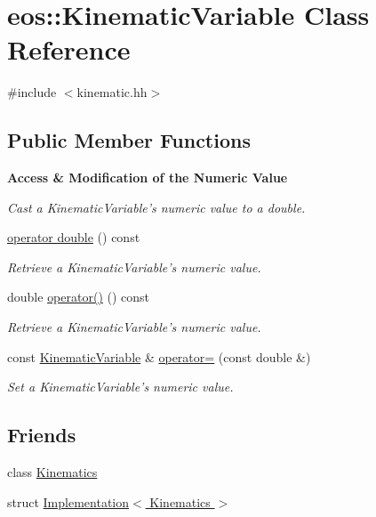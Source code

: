 \hypertarget{classeos_1_1KinematicVariable}{
\section{eos::KinematicVariable Class Reference}
\label{classeos_1_1KinematicVariable}
}


{\ttfamily \#include $<$kinematic.hh$>$}\subsection*{Public Member Functions}
\begin{Indent}{\bf Access \& Modification of the Numeric Value}\par
{\em \label{_amgrpe80791dade181f608b19efd4011ae6ee}
 Cast a KinematicVariable's numeric value to a double. }\begin{DoxyCompactItemize}
\item 
\hyperlink{classeos_1_1KinematicVariable_ae7397422b2e7c59c1bd8757705463839}{operator double} () const 
\begin{DoxyCompactList}\small\item\em Retrieve a KinematicVariable's numeric value. \item\end{DoxyCompactList}\item 
double \hyperlink{classeos_1_1KinematicVariable_a0281059d13f1e6bd8e9e36b89f96f60f}{operator()} () const 
\begin{DoxyCompactList}\small\item\em Retrieve a KinematicVariable's numeric value. \item\end{DoxyCompactList}\item 
const \hyperlink{classeos_1_1KinematicVariable}{KinematicVariable} \& \hyperlink{classeos_1_1KinematicVariable_ac6f65d2b8959b6f3b66d31be915caba9}{operator=} (const double \&)
\begin{DoxyCompactList}\small\item\em Set a KinematicVariable's numeric value. \item\end{DoxyCompactList}\end{DoxyCompactItemize}
\end{Indent}
\subsection*{Friends}
\begin{DoxyCompactItemize}
\item 
class \hyperlink{classeos_1_1KinematicVariable_a8fb81632f9425f6152aade7346401b4c}{Kinematics}
\item 
struct \hyperlink{classeos_1_1KinematicVariable_a06e93a5d7c76d2cfb672a43a7dbd421b}{Implementation$<$ Kinematics $>$}
\end{DoxyCompactItemize}

